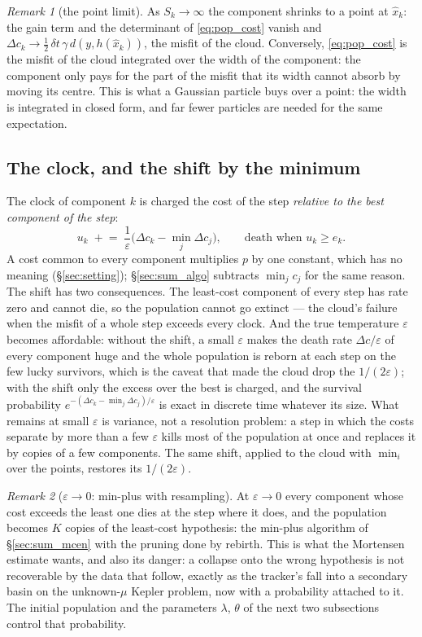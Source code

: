 \documentclass[11pt,a4paper]{article}
\newcommand{\xh}{\hat{x}}
\newcommand{\eps}{\varepsilon}
\newcommand{\dt}{\,\delta t}
\theoremstyle{plain}
\theoremstyle{definition}
\theoremstyle{remark}
\newtheorem{remark}{Remark}
\begin{document}
\begin{remark}[the point limit]
As $S_k\to\infty$ the component shrinks to a point at $\xh_k$: the gain term and the determinant of \eqref{eq:pop_cost} vanish and $\Delta c_k\to\tfrac12\dt\,\gamma\,d(y,h(\xh_k))$, the misfit of the cloud. Conversely, \eqref{eq:pop_cost} is the misfit of the cloud integrated over the width of the component: the component only pays for the part of the misfit that its width cannot absorb by moving its centre. This is what a Gaussian particle buys over a point: the width is integrated in closed form, and far fewer particles are needed for the same expectation.
\end{remark}

\subsection{The clock, and the shift by the minimum}
\label{sec:pop_clock}

The clock of component $k$ is charged the cost of the step \emph{relative to the best component of the step}:
\begin{equation}
  u_k \;\mathrel{+}=\; \frac1\eps\Big(\Delta c_k-\min_j\Delta c_j\Big), \qquad \text{death when } u_k\ge e_k .
  \label{eq:pop_clock}
\end{equation}
A cost common to every component multiplies $p$ by one constant, which has no meaning (\S\ref{sec:setting}); \S\ref{sec:sum_algo} subtracts $\min_jc_j$ for the same reason. The shift has two consequences. The least-cost component of every step has rate zero and cannot die, so the population cannot go extinct --- the cloud's failure when the misfit of a whole step exceeds every clock. And the true temperature $\eps$ becomes affordable: without the shift, a small $\eps$ makes the death rate $\Delta c/\eps$ of every component huge and the whole population is reborn at each step on the few lucky survivors, which is the caveat that made the cloud drop the $1/(2\eps)$; with the shift only the excess over the best is charged, and the survival probability $e^{-(\Delta c_k-\min_j\Delta c_j)/\eps}$ is exact in discrete time whatever its size. What remains at small $\eps$ is variance, not a resolution problem: a step in which the costs separate by more than a few $\eps$ kills most of the population at once and replaces it by copies of a few components. The same shift, applied to the cloud with $\min_i$ over the points, restores its $1/(2\eps)$.

\begin{remark}[$\eps\to0$: min-plus with resampling]
At $\eps\to0$ every component whose cost exceeds the least one dies at the step where it does, and the population becomes $K$ copies of the least-cost hypothesis: the min-plus algorithm of \S\ref{sec:sum_mcen} with the pruning done by rebirth. This is what the Mortensen estimate wants, and also its danger: a collapse onto the wrong hypothesis is not recoverable by the data that follow, exactly as the tracker's fall into a secondary basin on the unknown-$\mu$ Kepler problem, now with a probability attached to it. The initial population and the parameters $\lambda$, $\theta$ of the next two subsections control that probability.
\end{remark}
\end{document}
